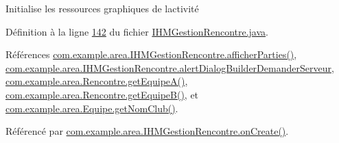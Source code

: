 Initialise les ressources graphiques de l\textquotesingle{}activité 



Définition à la ligne \hyperlink{_i_h_m_gestion_rencontre_8java_source_l00142}{142} du fichier \hyperlink{_i_h_m_gestion_rencontre_8java_source}{I\+H\+M\+Gestion\+Rencontre.\+java}.



Références \hyperlink{_i_h_m_gestion_rencontre_8java_source_l00322}{com.\+example.\+area.\+I\+H\+M\+Gestion\+Rencontre.\+afficher\+Parties()}, \hyperlink{_i_h_m_gestion_rencontre_8java_source_l00051}{com.\+example.\+area.\+I\+H\+M\+Gestion\+Rencontre.\+alert\+Dialog\+Builder\+Demander\+Serveur}, \hyperlink{_rencontre_8java_source_l00177}{com.\+example.\+area.\+Rencontre.\+get\+Equipe\+A()}, \hyperlink{_rencontre_8java_source_l00186}{com.\+example.\+area.\+Rencontre.\+get\+Equipe\+B()}, et \hyperlink{_equipe_8java_source_l00043}{com.\+example.\+area.\+Equipe.\+get\+Nom\+Club()}.



Référencé par \hyperlink{_i_h_m_gestion_rencontre_8java_source_l00064}{com.\+example.\+area.\+I\+H\+M\+Gestion\+Rencontre.\+on\+Create()}.



